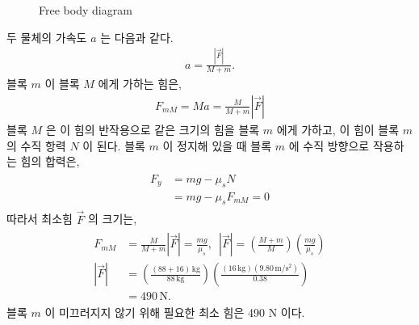 \documentclass[floatfix,nofootinbib,superscriptaddress,fleqn]{revtex4-2}
\begin{document}

\begin{figure}[h]
   \caption{Free body diagram}
\end{figure}

두 물체의 가속도 $a$ 는 다음과 같다.
\begin{align}
  a = \frac{|\vec{F}|}{M+m}.
\end{align}
 블록 $m$ 이 블록 $M$ 에게 가하는 힘은,
 \begin{align}
   F_{mM} = Ma = \frac{M}{M+m}|\vec{F}|
 \end{align} 
 블록 $M$ 은 이 힘의 반작용으로 같은 크기의 힘을 블록 $m$ 에게 가하고, 
 이 힘이 블록 $m$ 의 수직 항력 $N$ 이 된다. 블록 $m$ 이 정지해 있을 때 
 블록 $m$ 에 수직 방향으로 작용하는 힘의 합력은,
 \begin{align}
  \begin{split}
    F_y &= mg - \mu_sN \\
    &= mg - \mu_s F_{mM} = 0
  \end{split}
 \end{align}
 따라서 최소힘 $\vec{F}$ 의 크기는,
 \begin{align}
   \begin{split}
     F_{mM} &= \frac{M}{M+m}|\vec{F}| =\frac{mg}{\mu_s},\,\,\,
     |\vec{F}| = \left(\frac{M+m}{M}\right)\left(\frac{mg}{\mu_s}\right)  \\
     |\vec{F}| &= \left(\frac{(88+16)\,\mathrm{kg}}{88\,\mathrm{kg}}\right)
     \left(\frac{(16\,\mathrm{kg})(9.80\,\mathrm{m/s^2})}{0.38}\right)  \\
     &= 490\,\mathrm{N}.
   \end{split}
 \end{align}
 블록 $m$ 이 미끄러지지 않기 위해 필요한 최소 힘은 490 N 이다.
\end{document}
